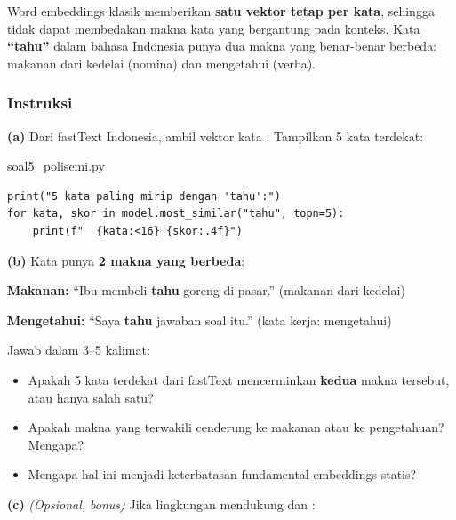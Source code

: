 \documentclass[12pt, a4paper]{article}
\begin{document}
Word embeddings klasik memberikan \textbf{satu vektor tetap per kata}, sehingga tidak dapat membedakan makna kata yang bergantung pada konteks. Kata \textbf{``tahu''} dalam bahasa Indonesia punya dua makna yang benar-benar berbeda: makanan dari kedelai (nomina) dan mengetahui (verba).

\subsubsection{Instruksi}
\label{sec:soal5-instruksi}

\textbf{(a)} Dari fastText Indonesia, ambil vektor kata . Tampilkan 5 kata terdekat:

\begin{codewindow}{soal5\_polisemi.py}
\begin{lstlisting}[style=pycode]
print("5 kata paling mirip dengan 'tahu':")
for kata, skor in model.most_similar("tahu", topn=5):
    print(f"  {kata:<16} {skor:.4f}")
\end{lstlisting}
\end{codewindow}

\textbf{(b)} Kata  punya \textbf{2 makna yang berbeda}:

\begin{callout}[ctpBlue]
{\color{ctpBlue}\bfseries Makanan:} ``Ibu membeli \textbf{tahu} goreng di pasar.'' (makanan dari kedelai)
\end{callout}
\begin{callout}[ctpBlue]
{\color{ctpBlue}\bfseries Mengetahui:} ``Saya \textbf{tahu} jawaban soal itu.'' (kata kerja: mengetahui)
\end{callout}

Jawab dalam 3--5 kalimat:
\begin{itemize}
  \item Apakah 5 kata terdekat dari fastText mencerminkan \textbf{kedua} makna tersebut, atau hanya salah satu?
  \item Apakah makna yang terwakili cenderung ke makanan atau ke pengetahuan? Mengapa?
  \item Mengapa hal ini menjadi keterbatasan fundamental embeddings statis?
\end{itemize}

\textbf{(c)} \emph{(Opsional, bonus)} Jika lingkungan mendukung  dan :
\end{document}
